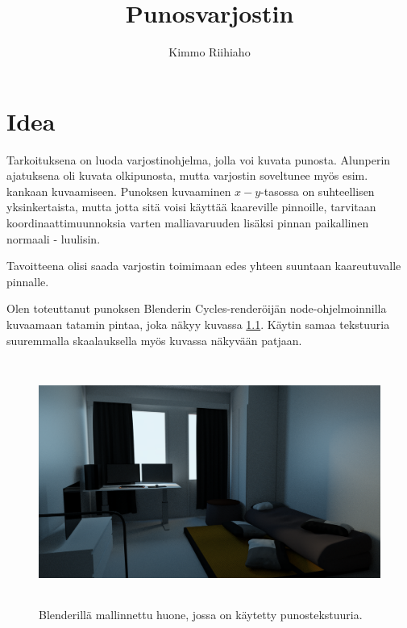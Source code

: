 \documentclass[utf8,bachelor]{gradu3}
\begin{document}
\title{Punosvarjostin}



\author{Kimmo Riihiaho}
\type{} %

\maketitle

\mainmatter

\chapter{Idea}

Tarkoituksena on luoda varjostinohjelma, jolla voi kuvata punosta. Alunperin ajatuksena oli kuvata olkipunosta, mutta varjostin soveltunee myös esim. kankaan kuvaamiseen. Punoksen kuvaaminen $x-y$-tasossa on suhteellisen yksinkertaista, mutta jotta sitä voisi käyttää kaareville pinnoille, tarvitaan koordinaattimuunnoksia varten malliavaruuden lisäksi pinnan paikallinen normaali - luulisin.

Tavoitteena olisi saada varjostin toimimaan edes yhteen suuntaan kaareutuvalle pinnalle.  

Olen toteuttanut punoksen Blenderin Cycles-renderöijän node-ohjelmoinnilla kuvaamaan tatamin pintaa, joka näkyy kuvassa \ref{fig:room}. Käytin samaa tekstuuria suuremmalla skaalauksella myös kuvassa näkyvään patjaan.

\begin{figure}[h] 
	\centering
	\includegraphics[height=8cm]{day1.png}
	\caption{Blenderillä mallinnettu huone, jossa on käytetty punostekstuuria.}
	\label{fig:room}
\end{figure}
\end{document}
